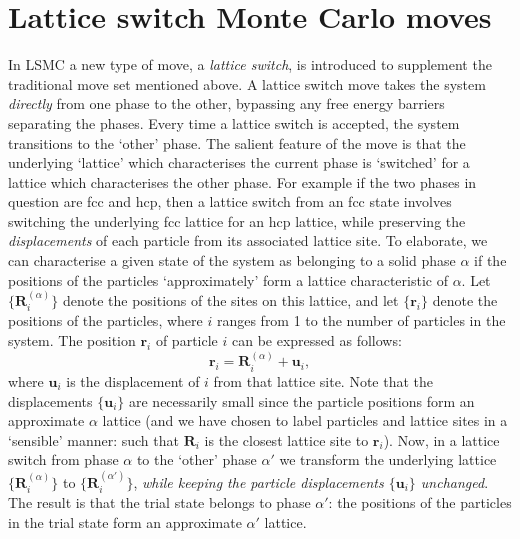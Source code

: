 \documentclass{report}
\begin{document}
\section{Lattice switch Monte Carlo moves}\label{sec:lattice_switch}
In LSMC a new type of move, a \emph{lattice switch}, is introduced to supplement the traditional move set mentioned above. A lattice switch move takes
the system \emph{directly} from one phase to the other, bypassing any free energy barriers separating the phases. Every time a lattice switch is accepted, 
the system transitions to the `other' phase. The salient feature of the move is that the underlying `lattice' which characterises the current phase is 
`switched' for a lattice which characterises the other phase. For example if the two phases in question are fcc and hcp, then a lattice switch from an
fcc state involves switching the underlying fcc lattice for an hcp lattice, while preserving the \emph{displacements} of each particle from its associated
lattice site. 
%
To elaborate, we can characterise a given state of the system as belonging to a solid phase $\alpha$ if the positions of the particles 
`approximately' form a lattice characteristic of $\alpha$. Let $\lbrace\mathbf{R}^{(\alpha)}_i\rbrace$ denote the positions of the sites on this lattice, 
and let $\lbrace\mathbf{r}_i\rbrace$ denote the positions of the particles, where $i$ ranges from 1 to the number of particles in the system. 
The position $\mathbf{r}_i$ of particle $i$ can be expressed as follows:
\begin{equation}
\mathbf{r}_i=\mathbf{R}^{(\alpha)}_i+\mathbf{u}_i,
\end{equation}
where $\mathbf{u}_i$ is the displacement of $i$ from that lattice site. Note that the displacements $\lbrace\mathbf{u}_i\rbrace$ are necessarily small 
since the particle positions form an approximate $\alpha$ lattice (and we have chosen to label particles and lattice sites in a `sensible' manner: such 
that $\mathbf{R}_i$ is the closest lattice site to $\mathbf{r}_i$). Now, in a lattice switch from phase $\alpha$ to the `other' phase $\alpha'$ we 
transform the underlying lattice $\lbrace\mathbf{R}^{(\alpha)}_i\rbrace$ to $\lbrace\mathbf{R}^{(\alpha')}_i\rbrace$, 
\emph{while keeping the particle displacements $\lbrace\mathbf{u}_i\rbrace$ unchanged}. The result is that the trial state belongs to phase 
$\alpha'$: the positions of the particles in the trial state form an approximate $\alpha'$ lattice.
\end{document}
